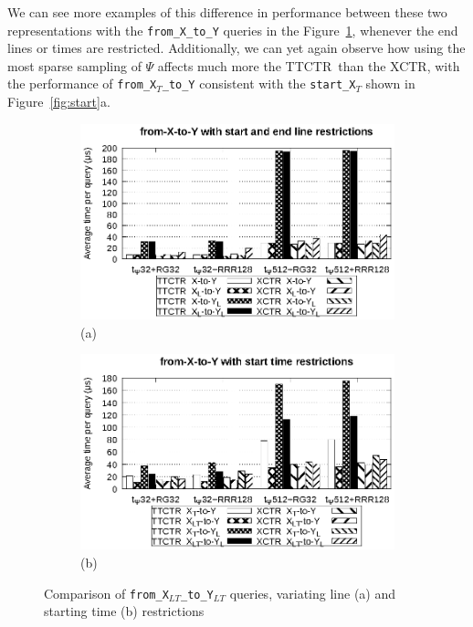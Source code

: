 \documentclass[runningheads]{llncs}
\newcommand{\ctr}{XCTR}
\newcommand{\ttctr}{TTCTR}
\begin{document}
We can see more examples of this difference in performance between these two representations with the \texttt{from\_X\_to\_Y} queries in the Figure~\ref{fig:xy0}, whenever the end lines or times are restricted. Additionally, we can yet again observe how using the most sparse sampling of $\Psi$ affects much more the \ttctr~than the \ctr, with the performance of \texttt{from\_X$_{T}$\_to\_Y} consistent with the \texttt{start\_X$_T$} shown in Figure~\ref{fig:start}a.

\begin{figure}[hbt!]
\begin{subfigure}{0.5\linewidth}
\includegraphics[width=\linewidth]{experiments/xy0.eps}
\vspace{-12pt}
\caption{\footnotesize (a)}
\vspace{-12pt}
\end{subfigure}%
\begin{subfigure}{0.5\linewidth}
\includegraphics[width=\linewidth]{experiments/xy1.eps}
\vspace{-12pt}
\caption{\footnotesize (b)}
\vspace{-12pt}
\end{subfigure}
\caption{Comparison of \texttt{from\_X$_{LT}$\_to\_Y$_{LT}$} queries, variating line (a) and starting time (b) restrictions}
\label{fig:xy0}
\end{figure}
\end{document}
